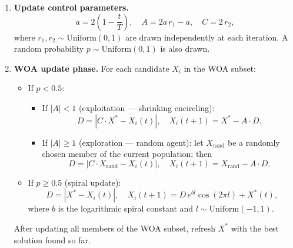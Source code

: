 \documentclass[a4paper, 12pt]{report}
\begin{document}
\begin{enumerate}

  \item \textbf{Update control parameters.}
        \[
          a = 2\!\left(1 - \frac{t}{T}\right), \quad
          A = 2a\,r_1 - a, \quad
          C = 2\,r_2,
        \]
        where $r_1, r_2 \sim \mathrm{Uniform}(0,1)$ are drawn
        independently at each iteration.  A random probability
        $p \sim \mathrm{Uniform}(0,1)$ is also drawn.

  \item \textbf{WOA update phase.}
        For each candidate $X_i$ in the WOA subset:
        \begin{itemize}
          \item If $p < 0.5$:
                \begin{itemize}
                  \item If $|A| < 1$ (exploitation --- shrinking
                        encircling):
                        \[
                          D = |C \cdot X^* - X_i(t)|, \quad
                          X_i(t{+}1) = X^* - A \cdot D.
                        \]
                  \item If $|A| \geq 1$ (exploration --- random agent):
                        let $X_\mathrm{rand}$ be a randomly chosen
                        member of the current population; then
                        \[
                          D = |C \cdot X_\mathrm{rand} - X_i(t)|, \quad
                          X_i(t{+}1) = X_\mathrm{rand} - A \cdot D.
                        \]
                \end{itemize}
          \item If $p \geq 0.5$ (spiral update):
                \[
                  D = |X^* - X_i(t)|, \quad
                  X_i(t{+}1) = D\,e^{bl}\cos(2\pi l) + X^*(t),
                \]
                where $b$ is the logarithmic spiral constant and
                $l \sim \mathrm{Uniform}(-1,1)$.
        \end{itemize}
        After updating all members of the WOA subset, refresh $X^*$
        with the best solution found so far.


\end{enumerate}
\end{document}
